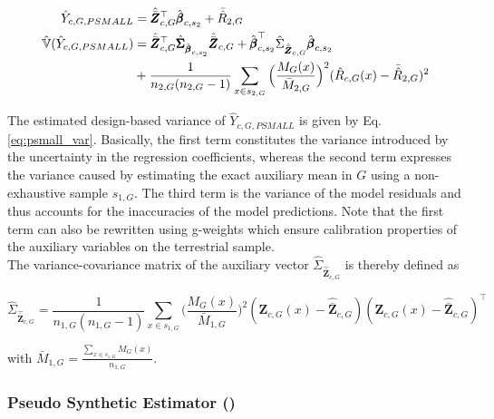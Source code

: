 \begin{subequations}\label{eq:psmall}
	\begin{align}
	\hat{Y}_{c,G,PSMALL} &= \hat{\bar{\pmb{Z}}}_{c,G}^{\top}\hat{\pmb{\beta}}_{c,s_2} + \bar{\hat{R}}_{2,G} \label{eq:psmall_pest} \\
	\hat{\mathbb{V}}(\hat{Y}_{c,G,PSMALL}) & = \hat{\bar{\pmb{Z}}}_{c,G}^{\top}\hat{\pmb{\Sigma}}_{\hat{\pmb{\beta}}_{c,s_2}}\hat{\bar{\pmb{Z}}}_{c,G}
	+ \hat{\pmb{\beta}}_{c,s_2}^{\top}\hat{\Sigma}_{\hat{\bar{\pmb{Z}}}_{c,G}}\hat{\pmb{\beta}}_{c,s_2} \nonumber \\
	& + \frac{1}{n_{2,G}(n_{2,G}-1)}\sum_{x \in s_{2,G}}\Big(\frac{M_{G}(x)}{\bar{M}_{2,G}}\Big)^2(\hat{R}_{c,G}(x) - \bar{\hat{R}}_{2,G})^2
	\label{eq:psmall_var}
	\end{align}
\end{subequations}

The estimated design-based variance of $ \hat{Y}_{c,G,PSMALL}$ is given by Eq. \ref{eq:psmall_var}. Basically, the first term constitutes the variance introduced by the uncertainty in the regression coefficients, whereas the second term expresses the variance caused by estimating the exact auxiliary mean in $G$ using a non-exhaustive sample $s_{1,G}$. The third term is the variance of the model residuals and thus accounts for the inaccuracies of the model predictions. Note that the first term can also be rewritten using g-weights \cite[pg.14]{mandallaz2016} which ensure calibration properties of the auxiliary variables on the terrestrial sample.\\ 

The variance-covariance matrix of the auxiliary vector $\hat{\Sigma}_{\hat{\bar{\pmb{Z}}}_{c,G}}$ is thereby defined as

\begin{equation}\label{estvarcovaux_G}
\hat{\Sigma}_{\hat{\bar{\pmb{Z}}}_{c,G}} = \frac{1}{n_{1,G}(n_{1,G}-1)} \sum_{x \in s_{1,G}} \big(\frac{M_{G}(x)}{\bar{M}_{1,G}}\big)^2 (\pmb{Z}_{c,G}(x)-\hat{\bar{\pmb{Z}}}_{c,G})(\pmb{Z}_{c,G}(x)-\hat{\bar{\pmb{Z}}}_{c,G})^{\top}
\end{equation}

with $\bar{M}_{1,G}=\frac{\sum_{x \in s_{1,G}}M_{G}(x)}{n_{1,G}}$.\\



\subsubsection{Pseudo Synthetic Estimator (\psynth{})}
\label{sec:psynth}

